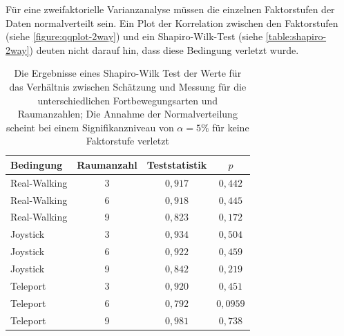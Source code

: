                     Für eine zweifaktorielle Varianzanalyse müssen die einzelnen Faktorstufen der Daten normalverteilt sein.
                    Ein Plot der Korrelation zwischen den Faktorstufen (siehe \autoref{figure:qqplot-2way}) und ein Shapiro-Wilk-Test (siehe \autoref{table:shapiro-2way}) deuten nicht darauf hin, dass diese Bedingung verletzt wurde.

                    \begin{table}[!h]
                        \renewcommand\arraystretch{1.2}
                        \centering
        \begin{tabular}{lccc} \toprule
            Bedingung    & Raumanzahl & Teststatistik& $p$   \\ \midrule
            Real-Walking &  3         & $0,917$      & $0,442$ \\
            Real-Walking &  6         & $0,918$      & $0,445$ \\
            Real-Walking &  9         & $0,823$      & $0,172$ \\
            Joystick     &  3         & $0,934$      & $0,504$ \\
            Joystick     &  6         & $0,922$      & $0,459$ \\
            Joystick     &  9         & $0,842$      & $0,219$ \\
            Teleport     &  3         & $0,920$      & $0,451$ \\
            Teleport     &  6         & $0,792$      & $0,0959$ \\
            Teleport     &  9         & $0,981$      & $0,738$ \\ \bottomrule
        \end{tabular}
                        \caption{Die Ergebnisse eines Shapiro-Wilk Test der Werte für das Verhältnis zwischen Schätzung und Messung für die unterschiedlichen Fortbewegungsarten und Raumanzahlen; Die Annahme der Normalverteilung scheint bei einem Signifikanzniveau von $\alpha = 5\% $ für keine Faktorstufe verletzt}\label{table:shapiro-2way}
                    \end{table}

